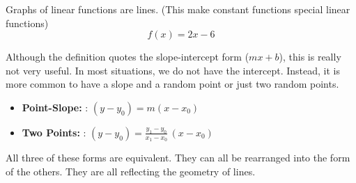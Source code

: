 \documentclass{ximera}
\begin{document}
Graphs of linear functions are lines. 
(This make constant functions special linear functions)
\[ f(x) = 2x - 6\]





\begin{image}
\end{image}






Although the definition quotes the slope-intercept form ($m x + b$), this is really not very useful.  In most situations, we do not have the intercept.  Instead, it is more common to have a slope and a random point or just two random points.



\begin{itemize}

\item \textbf{\textcolor{blue!55!black}{Point-Slope:}}  : $(y - y_0) = m (x - x_0)$

\item \textbf{\textcolor{blue!55!black}{Two Points:}}  : $(y - y_0) = \frac{y_1 - y_0}{x_1 - x_0} \, (x - x_0)$

\end{itemize}


All three of these forms are equivalent.  They can all be rearranged into the form of the others.  They are all reflecting the geometry of lines.  
\end{document}
